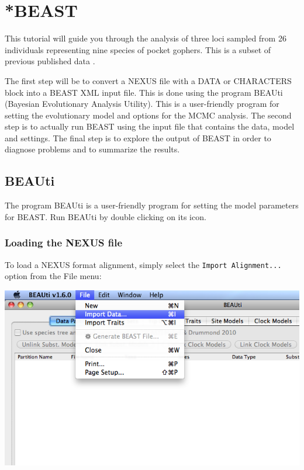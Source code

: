 \documentclass[12pt]{article}
\begin{document}

\section*{*BEAST}

This tutorial will guide you through the analysis of three loci sampled from 26 individuals representing nine species of pocket gophers. This is a subset of previous published data \cite{belfiore2008multilocus}. 

The first step will be to convert a NEXUS file with a DATA or CHARACTERS block into a BEAST XML input file. This is done using the program BEAUti (Bayesian Evolutionary Analysis Utility). This is a user-friendly program for setting the evolutionary model and options for the MCMC analysis. The second step is to actually run BEAST using the input file that contains the data, model and settings. The final step is to explore the output of BEAST in order to diagnose problems and to summarize the results.

\subsection*{BEAUti}

The program BEAUti is a user-friendly program for setting the
model parameters for BEAST. Run BEAUti by double clicking on its icon. 

\subsubsection*{Loading the NEXUS file }

To load a NEXUS format alignment, simply select the \texttt{Import
Alignment...} option from the File menu: 

\medskip{}

\includegraphics[scale=0.5]{figures/ImportNexus}
\end{document}
